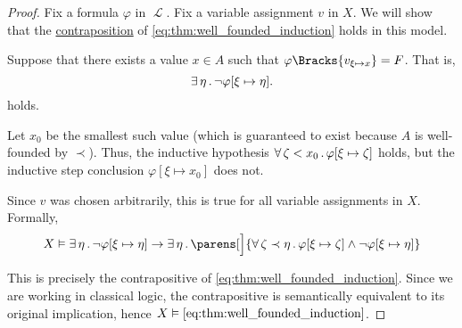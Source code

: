 \begin{proof}
  Fix a formula \( \varphi \) in \( \mscrL \). Fix a variable assignment \( v \) in \( X \). We will show that the \hyperref[def:material_implication/contrapositive]{contraposition} of \eqref{eq:thm:well_founded_induction} holds in this model.

  Suppose that there exists a value \( x \in A \) such that \( \varphi\Bracks{v_{\xi \mapsto x}} = F \). That is,
  \begin{equation*}
    \exists \thinspace \eta \thinspace . \thinspace \neg \varphi[\xi \mapsto \eta].
  \end{equation*}
  holds.

  Let \( x_0 \) be the smallest such value (which is guaranteed to exist because \( A \) is well-founded by \( \prec \)). Thus, the inductive hypothesis \( \forall \thinspace \zeta < x_0 \thinspace . \thinspace \varphi[\xi \mapsto \zeta] \) holds, but the inductive step conclusion \( \varphi[\xi \mapsto x_0] \) does not.

  Since \( v \) was chosen arbitrarily, this is true for all variable assignments in \( X \). Formally,
  \begin{equation}\label{eq:thm:well_founded_induction/contraposition}
    X
    \vDash
    \qexists \eta \neg \varphi[\xi \mapsto \eta]
    \rightarrow
    \qexists \eta
    \parens[\Big]
      {
        \qforall {\zeta \prec \eta} \varphi[\xi \mapsto \zeta] \wedge \neg \varphi[\xi \mapsto \eta]
      }
  \end{equation}

  This is precisely the contrapositive of \eqref{eq:thm:well_founded_induction}. Since we are working in classical logic, the contrapositive is semantically equivalent to its original implication, hence \( X \vDash \eqref{eq:thm:well_founded_induction} \).
\end{proof}

